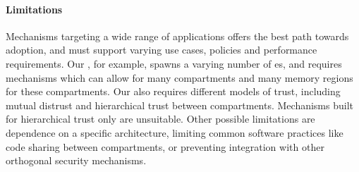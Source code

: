 \paragraph{Limitations}
Mechanisms targeting a wide range of applications offers the best path
towards adoption, and must support varying use cases, policies and
performance requirements.
Our \browser, for example, spawns a varying number of \sandbox{}es, and
requires mechanisms which can allow for many compartments and many 
memory regions for these compartments.
Our \browser also requires different models of trust, including mutual
distrust and hierarchical trust between compartments.
Mechanisms built for hierarchical trust only are unsuitable.
Other possible limitations are dependence on a specific architecture,
limiting common software practices like code sharing between compartments,
or preventing integration with other orthogonal security mechanisms.

